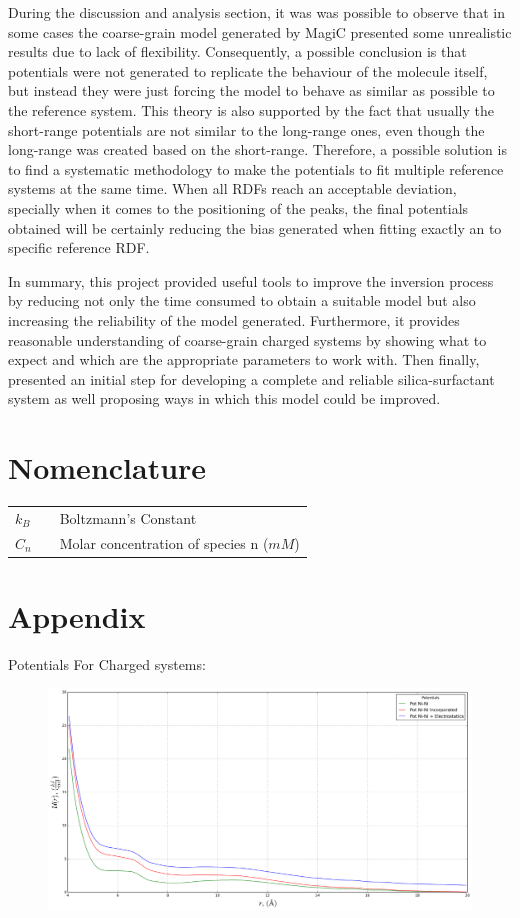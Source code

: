 \documentclass[10pt,a4paper,twoside]{article}
\begin{document}
During the discussion and analysis section, it was was possible to observe that in some cases the coarse-grain model generated by MagiC presented some unrealistic results due to lack of flexibility. Consequently, a possible conclusion is that potentials were not generated to replicate the behaviour of the molecule itself, but instead they were just forcing the model to behave as similar as possible to the reference system. This theory is also supported by the fact that usually the short-range potentials are not similar to the long-range ones, even though the long-range was created based on the short-range. Therefore, a possible solution is to find a systematic methodology to make the potentials to fit multiple reference systems at the same time. When all RDFs reach an acceptable deviation, specially when it comes to the positioning of the peaks, the final potentials obtained will be certainly reducing the bias generated when fitting exactly an to specific reference RDF.

In summary, this project provided useful tools to improve the inversion process by reducing not only the time consumed to obtain a suitable model but also increasing the reliability of the model generated. Furthermore, it provides reasonable understanding of coarse-grain charged systems by showing what to expect and which are the appropriate parameters to work with. Then finally, presented an initial step for developing a complete and reliable silica-surfactant system as well proposing ways in which this model could be improved.

\section{Nomenclature} 
   \begin{tabulary}{1.0\textwidth}{LCL}
   $k_B$ & & Boltzmann's Constant\\
   $C_n$ &   & Molar concentration of species n ($mM$) \\
   \end{tabulary}


\vfill
\newpage
\section{Appendix}
\label{sec:appendix}
\setcounter{page}{1}

Potentials For Charged systems:
\begin{figure}[H]
  \begin{center}
	\includegraphics[width=0.8 \textwidth]{./graphs/PtsChargedSys0}
  \end{center}
\end{figure}
\end{document}

